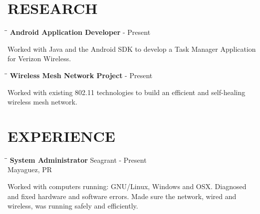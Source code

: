\documentclass{res}
\begin{document}
\begin{resume}
\section{RESEARCH}

   \vspace{-0.1in}  
   \begin{tabbing}
   \hspace{2.3in}\= \hspace{2.6in}\= \kill %
    {\bf Android Application Developer} \>     - Present

   \end{tabbing}\vspace{-20pt}      %
    Worked with Java and the Android SDK to develop a Task Manager Application for Verizon Wireless. 

   \vspace{-0.1in}  
   \begin{tabbing}
   \hspace{2.3in}\= \hspace{2.6in}\= \kill %
    {\bf Wireless Mesh Network Project} \>     - Present

   \end{tabbing}\vspace{-20pt}      %
    Worked with existing 802.11 technologies to build an efficient and self-healing wireless mesh network.

\section{EXPERIENCE}
   
   \vspace{-0.1in}  
   \begin{tabbing}
   \hspace{2.3in}\= \hspace{2.6in}\= \kill %
    {\bf System Administrator} \>Seagrant      - Present\\
                             \>Mayaguez, PR
   \end{tabbing}\vspace{-20pt}      %
    Worked with computers running: GNU/Linux, Windows and OSX. Diagnosed and fixed hardware and software errors. Made sure the network, wired and wireless, was running safely and efficiently. 
    


\end{resume}
\end{document}
